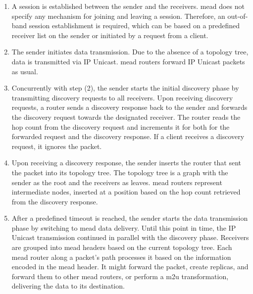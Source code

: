 \begin{enumerate}[label={(\arabic*)}]

\item
A session is established between the sender and the receivers.
\gls{mead} does not specify any mechanism for joining and leaving a session.
Therefore, an out-of-band session establishment is required, which can be based
    on a predefined receiver list on the sender or initiated by a request from
    a client.

\item
The sender initiates data transmission.
Due to the absence of a topology tree, data is transmitted via IP Unicast.
\gls{mead} routers forward IP Unicast packets as usual.

\item
Concurrently with step (2), the sender starts the initial discovery phase by
    transmitting discovery requests to all receivers.
Upon receiving discovery requests, a router sends a discovery response back to
    the sender and forwards the discovery request towards the designated
    receiver.
The router reads the hop count from the discovery request and increments it for
    both for the forwarded request and the discovery response.
If a client receives a discovery request, it ignores the packet.

\item
Upon receiving a discovery response, the sender inserts the router that sent
    the packet into its topology tree.
The topology tree is a graph with the sender as the root and the receivers as
    leaves.
\gls{mead} routers represent intermediate nodes, inserted at a position based
    on the hop count retrieved from the discovery response.

\item
After a predefined timeout is reached, the sender starts the data transmission
    phase by switching to \gls{mead} data delivery.
Until this point in time, the IP Unicast transmission continued in parallel
    with the discovery phase.
Receivers are grouped into \gls{mead} headers based on the current topology
    tree.
Each \gls{mead} router along a packet's path processes it based on the 
    information encoded in the \gls{mead} header.
It might forward the packet, create replicas, and forward them to other
    \gls{mead} routers, or perform a \gls{m2u} transformation, delivering the
    data to its destination.
\end{enumerate}

